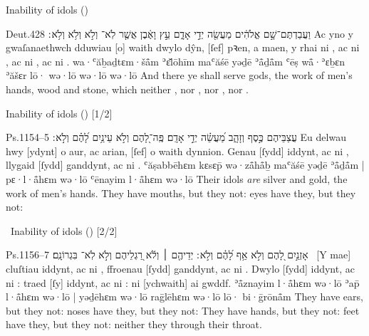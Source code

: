 \begin{frame}{\ex Inability of idols \hfill ()}
	\begin{example}{Deut.}{4}{28}{}{}
		\quoling
		{וַעֲבַדְתֶּם־שָׁ֣ם אֱלֹהִ֔ים מַעֲשֵׂ֖ה יְדֵ֣י אָדָ֑ם עֵ֣ץ וָאֶ֔בֶן אֲשֶׁ֤ר לֹֽא־ וְלֹ֣א  וְלֹ֥א  וְלֹ֥א ׃}
		{Ac yno y gwaſanaethwch dduwiau [o] waith dwylo dŷn, [ſef] pꝛen, a maen, y rhai ni , ac ni , ac ni , ac ni .}
		{wa·ʿăḇaḏtɛm·šå̄m ʾɛ̆lōhīm maʿăśē yəḏē ʾå̄ḏå̄m ʿēṣ wå̄·ʾɛḇɛn ʾăšɛr lō· wə·lō  wə·lō  wə·lō }
		{And there ye shall serve gods, the work of men’s hands, wood and stone, which neither , nor , nor , nor .}
	\end{example}
\end{frame}


\begin{frame}{\ex Inability of idols \hfill () [1/2]}
	\begin{example}{Ps.}{115}{4–5}{}{}
		\quoling
		{%
			עֲצַבֵּיהֶם כֶּ֣סֶף וְזָהָ֑ב מַ֝עֲשֵׂ֗ה יְדֵ֣י אָדָֽם׃
			פֶּֽה־לָ֭הֶם וְלֹ֣א  עֵינַ֥יִם לָ֝הֶ֗ם וְלֹ֣א ׃
		}
		{%
			Eu delwau hwy [ydynt] o aur, ac arian, [ſef] o waith dynnion.
			Genau [ſydd] iddynt, ac ni , llygaid [ſydd] ganddynt, ac ni .
		}
		{%
			ʿăṣabbēhɛm kɛsɛp̄ wə·zå̄hå̄ḇ maʿăśē yəḏē ʾå̄ḏå̄m |
			pɛ·l·å̄hɛm wə·lō  ʿēnayim l·å̄hɛm wə·lō 
		}
		{%
			Their idols \textit{are} silver and gold, the work of men’s hands.
			They have mouths, but they  not: eyes have they, but they  not:
		}
	\end{example}
\end{frame}


\begin{frame}{\excont\ Inability of idols \hfill () [2/2]}
	\begin{example}{Ps.}{115}{6–7}{}{}
		\quoling
		{%
			אָזְנַ֣יִם לָ֭הֶם וְלֹ֣א  אַ֥ף לָ֝הֶ֗ם וְלֹ֣א ׃
			יְדֵיהֶ֤ם ׀ וְלֹ֬א  רַ֭גְלֵיהֶם וְלֹ֣א  לֹֽא־ בִּגְרוֹנָֽם׃
		}
		{%
			~[Y mae] cluſtiau iddynt, ac ni , ffroenau [ſydd] ganddynt, ac ni .
			Dwylo [ſydd] iddynt, ac ni : traed [ſy] iddynt, ac ni : ni  [ychwaith] ai gwddf.
		}
		{%
			ʾå̄znayim l·å̄hɛm wə·lō  ʾap̄ l·å̄hɛm wə·lō  |
			yəḏēhɛm wə·lō  raḡlēhɛm wə·lō  lō· bi·ḡrōnå̄m
		}
		{%
			They have ears, but they  not: noses have they, but they  not:
			They have hands, but they  not: feet have they, but they  not: neither  they through their throat.
		}
	\end{example}
\end{frame}


